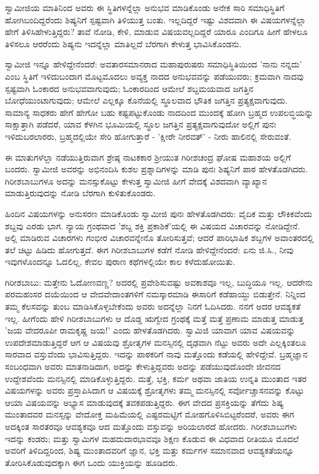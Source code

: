 ಸ್ವಾಮೀಜಿಯ ಮಾತಿನಿಂದ ಅವರು ಈ ಸ್ಥಿತಿಗಳನ್ನೆಲ್ಲಾ ಅನುಭವ ಮಾಡಿಕೊಂಡು ಅನೇಕ ಸಾರಿ ಸಮಾಧಿಸ್ಥಿತಿಗೆ ಹೋಗಿಬಂದಿದ್ದರೆಂದು ಶಿಷ್ಯನಿಗೆ ಸ್ಪಷ್ಟವಾಗಿ ತಿಳಿಯುತ್ತ ಬಂತು. ಇಲ್ಲದಿದ್ದರೆ ಇಷ್ಟು ವಿಶದವಾಗಿ ಈ ವಿಷಯಗಳನ್ನೆಲ್ಲಾ ಹೇಗೆ ತಿಳಿಸಿಹೇಳುತ್ತಿದ್ದರು? ತಾವೆ ನೋಡಿ, ಕೇಳಿ, ಮಾಡುವ ವಿಷಯವಲ್ಲದಿದ್ದರೆ ಯಾರೂ ಎಂದಿಗೂ ಹೀಗೆ ಹೇಳಲೂ ತಿಳಿಸಲೂ ಆರರೆಂದು ಶಿಷ್ಯನು ಇದನ್ನೆಲ್ಲಾ ಮಾತಿಲ್ಲದೆ ಬೆರಗಾಗಿ ಕೇಳುತ್ತ ಭಾವಿಸಿಕೊಂಡನು.

ಸ್ವಾಮೀಜಿ ಇನ್ನೂ ಹೇಳಿದ್ದೇನೆಂದರೆ: ಅವತಾರಸಮಾನರಾದ ಮಹಾಪುರುಷರು ಸಮಾಧಿಸ್ಥಿತಿಯಿಂದ 'ನಾನು ನನ್ನದು' ಎಂಬ ಸ್ಥಿತಿಗೆ ಇಳಿದುಬಂದಾಗ ಮೊಟ್ಟಮೊದಲು ಅವ್ಯಕ್ತ ನಾದದ ಅನುಭವವನ್ನು ಪಡೆಯುವರು; ಕ್ರಮವಾಗಿ ನಾದವು ಸ್ಪಷ್ಟವಾಗಿ ಓಂಕಾರದ ಅನುಭವವಾಗುವುದು; ಓಂಕಾರದಿಂದ ಆಮೇಲೆ ಶಬ್ದಮಯವಾದ ಜಗತ್ತಿನ ಬೋಧೆಯುಂಟಾಗುವುದು; ಆಮೇಲೆ ಎಲ್ಲಕ್ಕೂ ಕೊನೆಯಲ್ಲಿ ಸ್ಥೂಲವಾದ ಭೌತಿಕ ಜಗತ್ತಿನ ಪ್ರತ್ಯಕ್ಷವಾಗುವುದು. ಸಾಮಾನ್ಯ ಸಾಧಕರು ಹೇಗೆ ಹೇಗೋ ಬಹು ಕಷ್ಟಪಟ್ಟುಕೊಂಡು ನಾದದಿಂದ ಮುಂದಕ್ಕೆ ಹೋಗಿ ಬ್ರಹ್ಮದ ಉಪಲಬ್ಧಿಯನ್ನು ಸಾಕ್ಷಾತ್ತಾಗಿ ಪಡೆದರೆ, ಯಾವ ಕೆಳಗಿನ ಭೂಮಿಯಲ್ಲಿ ಸ್ಥೂಲ ಜಗತ್ತಿನ ಪ್ರತ್ಯಕ್ಷವಾಗುವುದೋ ಅಲ್ಲಿಗೆ ಪುನಃ ಇಳಿದುಬರಲಾರರು, ಬ್ರಹ್ಮದಲ್ಲಿಯೇ ಸೇರಿ ಹೋಗುತ್ತಾರೆ - 'ಕ್ಷೀರೇ ನೀರವತ್' - ನೀರು ಹಾಲಿನಲ್ಲಿ ಸೇರುವಂತೆ.

ಈ ಮಾತುಗಳೆಲ್ಲಾ ನಡೆಯುತ್ತಿರುವಾಗ ಶ್ರೇಷ್ಠ ನಾಟಕಕಾರ ಶ‍್ರೀಯುತ ಗಿರೀಶಚಂದ್ರ ಘೋಷ ಮಹಾಶಯ ಅಲ್ಲಿಗೆ ಬಂದರು. ಸ್ವಾಮೀಜಿ ಅವರನ್ನು ಅಭಿನಂದಿಸಿ ಕುಶಲ ಪ್ರಶ್ನಾದಿಗಳನ್ನು ಮಾಡಿ ಪುನಃ ಶಿಷ್ಯನಿಗೆ ಪಾಠ ಹೇಳತೊಡಗಿದರು. ಗಿರೀಶಬಾಬುಗಳೂ ಅದನ್ನು ಮನಸ್ಸುಕೊಟ್ಟು ಕೇಳುತ್ತ ಸ್ವಾಮೀಜಿ ಹೀಗೆ ವೇದಕ್ಕೆ ವಿಶದವಾಗಿ ವ್ಯಾಖ್ಯಾನ ಮಾಡುತ್ತಿರುವುದನ್ನು ನೋಡಿ ಬೆರಗಾಗಿ ಕುಳಿತುಕೊಂಡರು.

ಹಿಂದಿನ ವಿಷಯಗಳನ್ನು ಅನುಸರಣ ಮಾಡಿಕೊಂಡು ಸ್ವಾಮೀಜಿ ಪುನಃ ಹೇಳತೊಡಗಿದರು: ವೈದಿಕ ಮತ್ತು ಲೌಕಿಕವೆಂದು ಶಬ್ದವು ಎರಡು ಭಾಗ. ನ್ಯಾಯ ಗ್ರಂಥವಾದ 'ಶಬ್ದ ಶಕ್ತಿ ಪ್ರಕಾಶಿಕೆ'ಯಲ್ಲಿ ಈ ವಿಷಯದ ವಿಚಾರವನ್ನು ನೋಡಿದ್ದೇನೆ. ಅಲ್ಲಿ ಮಾಡಿರುವ ವಿಚಾರಗಳು ಗಂಭೀರ ವಿಚಾರವನ್ನೇನೊ ತೋರಿಸುತ್ತವೆ; ಆದರೆ ಪಾರಿಭಾಷಿಕ ಶಬ್ದಗಳ ಅವಾಂತರದಲ್ಲಿ ತಲೆ ಚಿಟ್ಟು ಹಿಡಿದು ಹೋಗುತ್ತದೆ. ಈಗ ಗಿರೀಶಬಾಬುಗಳ ಕಡೆಗೆ ನೋಡಿ ಹೇಳಿದ್ದೇನೆಂದರೆ: ಏನು ಜಿ.ಸಿ., ನೀವು ಇವುಗಳೊಂದನ್ನೂ ಓದಲಿಲ್ಲ, ಕೇವಲ ಪುರಾಣ ಕಥೆಗಳಲ್ಲಿಯೇ ಕಾಲ ಕಳೆದುಹೋಯಿತು.

ಗಿರೀಶಬಾಬು: ಮತ್ತೇನು ಓದೋಣವಣ್ಣ? ಅದರಲ್ಲಿ ಪ್ರವೇಶಿಸುವಷ್ಟು ಅವಕಾಶವೂ ಇಲ್ಲ, ಬುದ್ಧಿಯೂ ಇಲ್ಲ. ಆದರೇನು ಪರಮಹಂಸರ ದಯೆಯಿಂದ ಆ ವೇದವೇದಾಂತಗಳಿಗೆ ನಮಸ್ಕಾರಮಾಡಿ ಈಸಾರಿಗೆ ಕಡೆಹಾಯ್ದು ಬಿಡುತ್ತೇನೆ. ನಿನ್ನಿಂದ ತಮ್ಮ ಕೆಲಸವನ್ನು ತುಂಬ ಮಾಡಿಸಿಕೊಳ್ಳಬೇಕೆಂದು ಅವರು ಅದನ್ನೆಲ್ಲಾ ನಿನಗೆ ಓದಿಸಿದರು. ನನಗೆ ಅದರ ಆವಶ್ಯಕತೆ ಇಲ್ಲ. ಹೀಗೆಂದು ಹೇಳಿ ಗಿರೀಶಬಾಬುಗಳು ಆ ದೊಡ್ಡ ಋಗ್ವೇದ ಗ್ರಂಥಕ್ಕೆ ಮತ್ತೆ ಮತ್ತೆ ಪ್ರಣಾಮ ಮಾಡುತ್ತ ಮಾಡುತ್ತ 'ಜಯ ವೇದರೂಪೀ ರಾಮಕೃಷ್ಣ ಜಯ!' ಎಂದು ಹೇಳತೊಡಗಿದರು. ಸ್ವಾಮಿಜಿ ಯಾವಾಗ ಯಾವ ವಿಷಯವನ್ನು ಉಪದೇಶಮಾಡುತ್ತಿದ್ದರೆ ಆಗ ಆ ವಿಷಯವು ಶ್ರೋತೃಗಳ ಮನಸ್ಸಿನಲ್ಲಿ ದೃಢವಾಗಿ ನೆಟ್ಟು ಅವರು ಅದೇ ಎಲ್ಲಕ್ಕಿಂತಲೂ ಸಾರವಾದ ವಸ್ತುವೆಂದು ಭಾವಿಸುತ್ತಿದ್ದರು. ಇದನ್ನು ಪಾಠಕರಿಗೆ ನಾವು ಮತ್ತೊಂದು ಕಡೆಯಲ್ಲಿ ಹೇಳಿದ್ದೇವೆ. ಬ್ರಹ್ಮಜ್ಞಾನ ಸಂಬಂಧವಾಗಿ ಅವರು ಮಾತನಾಡಿದಾಗ, ಅದನ್ನು ಕೇಳುತ್ತಿದ್ದವರು ಅದನ್ನು ಪಡೆಯುವುದೊಂದೇ ಜೀವನದ ಉದ್ದೇಶವೆಂದು ಮನಸ್ಸಿನಲ್ಲಿ ಮಾಡಿಕೊಳ್ಳುತ್ತಿದ್ದರು. ಮತ್ತೆ, ಭಕ್ತಿ, ಕರ್ಮ ಅಥವಾ ಜಾತಿಯ ಉನ್ನತಿ ಮುಂತಾದ ಇತರ ವಿಷಯಗಳನ್ನು ಅವರು ಪ್ರಸ್ತಾಪಿಸಿದಾಗ ಆ ವಿಷಯಕ್ಕೆ ಶ್ರೋತೃಗಳು ತಮ್ಮ ಮನಸ್ಸಿನಲ್ಲಿ ಸರ್ವೋಚ್ಚಾಸನವನ್ನು ಕೊಟ್ಟು ಆಯಾ ವಿಷಯವನ್ನು ಅಭ್ಯಾಸ ಮಾಡುವುದಕ್ಕೆ ತವಕಪಡುತ್ತಿದ್ದರು. ಈಗ ವೇದದ ಪ್ರಸಕ್ತಿಯನ್ನು ತೆಗೆದು ಶಿಷ್ಯ ಮುಂತಾದವರ ಮನಸ್ಸನ್ನು ವೇದೋಕ್ತ ಮಹಿಮೆಯಲ್ಲಿ ಎಷ್ಟರಮಟ್ಟಿಗೆ ಮೋಹಗೊಳಿಸಿಬಿಟ್ಟರೆಂದರೆ, ಅವರು ಈಗ ಅದಕ್ಕಿಂತ ಸಾರತರವೂ ಆವಶ್ಯಕವೂ ಆದ ಮತ್ತೊಂದು ವಸ್ತುವನ್ನು ಅರಿಯಲಾರದೆ ಹೋದರು. ಗಿರೀಶಬಾಬುಗಳು ಇದನ್ನು ಕಂಡರು; ಮತ್ತು ಸ್ವಾಮಿಗಳ ಮಹದುದಾರಭಾವವೂ ಶಿಕ್ಷಣ ಕೊಡುವ ಈ ವಿಧವಾದ ರೀತಿಯೂ ಮೊದಲೆ ಅವರಿಗೆ ತಿಳಿದಿದ್ದರಿಂದ, ಶಿಷ್ಯ ಮುಂತಾದವರಿಗೆ ಜ್ಞಾನ, ಭಕ್ತಿ ಮತ್ತು ಕರ್ಮಗಳ ಸಮಾನವಾದ ಆವಶ್ಯಕತೆಯನ್ನೂ ತೋರಿಸಿಕೊಡುವುದಕ್ಕಾಗಿ ಈಗ ಒಂದು ಯುಕ್ತಿಯನ್ನು ಹೂಡಿದರು.

